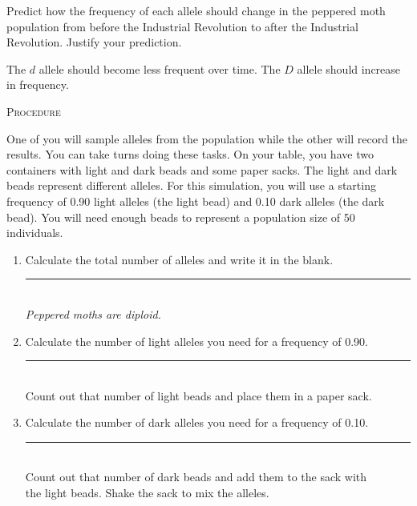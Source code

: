 \documentclass[12pt, hidelinks]{exam}
\newcommand*\AnswerBox[2]{%
    \parbox[t][#1]{0.92\textwidth}{%
    \begin{solution}#2\end{solution}}
    \vspace*{\stretch{0.1}}
}
\newcommand{\allele}[1]{$#1$}
\begin{document}
\begin{questions}

\question\label{ques:selection_prediction}
Predict how the frequency of each allele should change in the peppered moth population from before the Industrial Revolution to after the Industrial Revolution. Justify your prediction.

\AnswerBox{2\baselineskip}{The \allele{d} allele should become less frequent over time. The \allele{D} allele should increase in frequency.}

\newpage

\textsc{Procedure}

\medskip

One of you will sample alleles from the population while the other will record the results. You can take turns doing these tasks.  On your table, you have two containers with light and dark beads and some paper sacks. The light and dark beads represent different alleles. For this simulation, you will use a starting frequency of 0.90 light alleles (the light bead) and 0.10 dark alleles (the dark bead). You will need enough beads to represent a population size of 50 individuals.

\begin{enumerate}

	\item Calculate the total number of alleles and write it in the blank. \hfill \rule{0.5in}{0.4pt}\\ \emph{Peppered moths are diploid.} 
	
	\item Calculate the number of light alleles you need for a frequency of 0.90. \hfill \rule{0.5in}{0.4pt} \\ Count out that number of light beads and place them in a paper sack. 
	
	\item Calculate the number of dark alleles you need for a frequency of 0.10. \hfill \rule{0.5in}{0.4pt} \\ Count out that number of dark beads and add them to the sack with \\
	the light beads. Shake the sack to mix the alleles.
	
	

\end{enumerate}
\end{questions}
\end{document}
